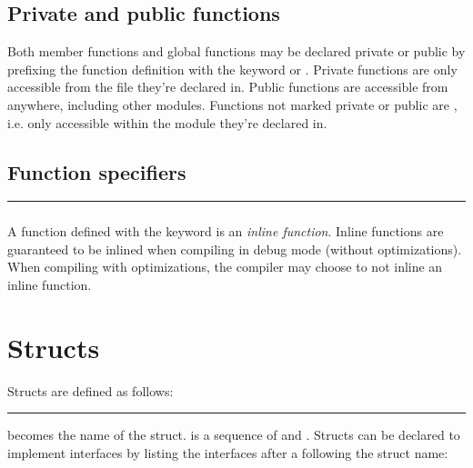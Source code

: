 \subsection{Private and public functions}

Both member functions and global functions may be declared private or public by
prefixing the function definition with the keyword  or
. Private functions are only accessible from the file they're
declared in. Public functions are accessible from anywhere, including other
modules. Functions not marked private or public are
, i.e. only accessible within the module they're
declared in.

\subsection{Function specifiers}
\label{sec:function-specifiers}

\begin{grammar}
\rule{function-specifier} 
\end{grammar}

\subsubsection{}

A function defined with the  keyword is an \textit{inline
function}. Inline functions are guaranteed to be inlined when compiling in debug
mode (without optimizations). When compiling with optimizations, the compiler
may choose to not inline an inline function.

\section{Structs}

Structs are defined as follows:

\begin{grammar}
\rule{struct-definition}   \code{\{}  \code{\}}
\end{grammar}

 becomes the name of the struct.
 is a sequence of
 and
. Structs can be declared to implement
interfaces by listing the interfaces after a \code{:} following the struct name:

